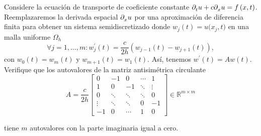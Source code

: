 Considere la ecuación de transporte de coeficiente constante
\begin{math}
    \difcp{u}{t}+
    c\difcp{u}{x}=
    f\left(x,t\right)
\end{math}.
Reemplazaremos la derivada espacial $\difcp{u}{x}$ por una
aproximación de diferencia finita para obtener un sistema
semidiscretizado donde
\begin{math}
    w_{j}\left(t\right)=
    u\big(x_{j},t\big)
\end{math}
en una malla uniforme $\Omega_{h}$
\begin{equation*}
    \forall j=1,\dotsc,m:
    w^{\prime}_{j}\left(t\right)=
    \dfrac{c}{2h}
    \left(
    w_{j-1}\left(t\right)-
    w_{j+1}\left(t\right)
    \right),
\end{equation*}
con
\begin{math}
    w_{0}\left(t\right)=
    w_{m}\left(t\right)
\end{math}
y
\begin{math}
    w_{m+1}\left(t\right)=
    w_{1}\left(t\right)
\end{math}.
Así, tenemos
\begin{math}
    w^{\prime}\left(t\right)=Aw\left(t\right)
\end{math}.
Verifique que los autovalores de la matriz antisimétrica
circulante
\begin{equation*}
    A=
    \frac{c}{2h}
    \begin{bmatrix}
        0      & -1     & 0      & \cdots & 1      \\
        1      & 0      & -1     & \ddots & \vdots \\
        0      & \ddots & \ddots & \ddots & 0      \\
        \vdots & \ddots & \ddots & 0      & -1     \\
        -1     & 0      & \cdots & 1      & 0
    \end{bmatrix}\in\mathbb{R}^{m\times m}
\end{equation*}

tiene $m$ autovalores con la parte imaginaria igual a cero.
